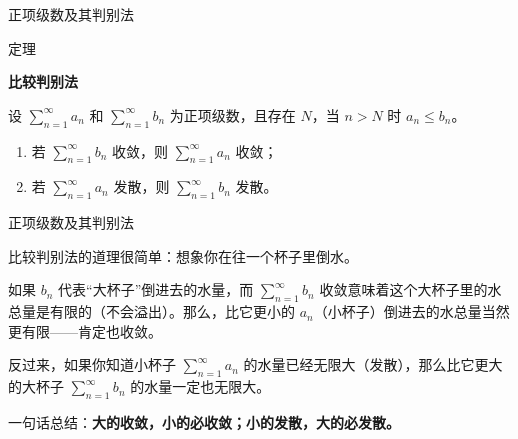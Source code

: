 \documentclass[aspectratio=169,10pt,fontset=fandol]{ctexbeamer}
\newenvironment{custom}[1]{\par\noindent\textbf{#1}\quad}{\par\vspace{0.8em}}
\begin{document}
\begin{frame}[t,fragile]{正项级数及其判别法}
\normalsize
\begin{block}{定理}
{\normalsize
\textbf{比较判别法}\par

设 \(\sum\limits_{n = 1}^{  \infty } a_n\) 和 \(\sum\limits_{n = 1}^{  \infty } b_n\) 为正项级数，且存在 \(N\)，当 \(n > N\) 时 \(a_n \leq b_n\)。
\begin{enumerate}
\item 若 \(\sum\limits_{n = 1}^{  \infty } b_n\) 收敛，则 \(\sum\limits_{n = 1}^{  \infty } a_n\) 收敛；
\item 若 \(\sum\limits_{n = 1}^{  \infty } a_n\) 发散，则 \(\sum\limits_{n = 1}^{  \infty } b_n\) 发散。
\end{enumerate}

}
\end{block}
\end{frame}
\begin{frame}[t,fragile]{正项级数及其判别法}
\normalsize
{\normalsize
比较判别法的道理很简单：想象你在往一个杯子里倒水。

如果 \(b_n\) 代表“大杯子”倒进去的水量，而 \(\sum\limits_{n = 1}^{  \infty } b_n\) 收敛意味着这个大杯子里的水总量是有限的（不会溢出）。那么，比它更小的 \(a_n\)（小杯子）倒进去的水总量当然更有限——肯定也收敛。

反过来，如果你知道小杯子 \(\sum\limits_{n = 1}^{  \infty } a_n\) 的水量已经无限大（发散），那么比它更大的大杯子 \(\sum\limits_{n = 1}^{  \infty } b_n\) 的水量一定也无限大。

一句话总结：\textbf{大的收敛，小的必收敛；小的发散，大的必发散。}

}
\end{frame}
\end{document}
